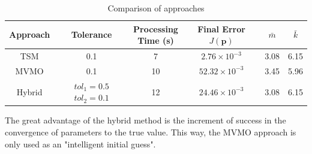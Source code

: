 \begin{table}[h]
	\caption{Comparison of approaches}
	\begin{center}
	\begin{tabular}{c|ccccc}
		Approach & Tolerance & \shortstack{Processing \\ Time (s)} & \shortstack{Final Error \\ $J(\mathbf{p})$} & $\bar{m}$ & $\bar{k}$ \\
		\hline
		TSM  & 0.1 & 7  & $2.76\times 10^{-3}$ & 3.08 & 6.15 \\
		MVMO  & 0.1 & 10 & $52.32\times 10^{-3}$ & 3.45 & 5.96 \\
		Hybrid  & \shortstack{$tol_{1}=0.5$ \\ $tol_{2}=0.1$} & 12 & $24.46\times 10^{-3}$ & 3.08 & 6.15
	\end{tabular}
	\end{center}
	\label{tab: SM}
\end{table}

The great advantage of the hybrid method is the increment of success in the convergence of parameters to the true value. This way, the MVMO approach is only used as an "intelligent initial guess".
